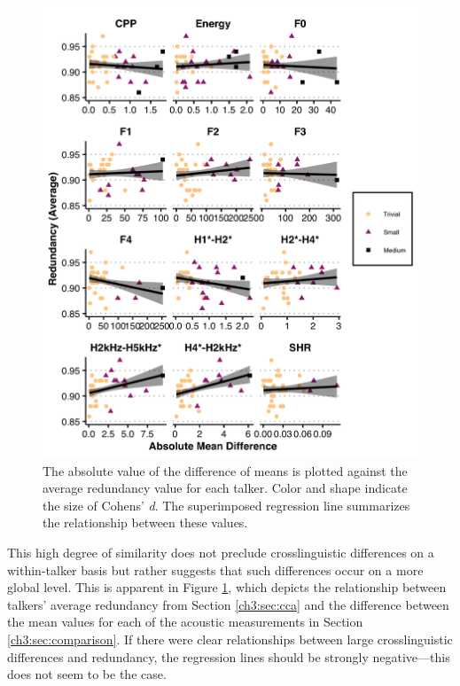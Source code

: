 \begin{figure}[htbp]
    \begin{center}
    \includegraphics[width=0.9\linewidth]{figures/ch3_redundancybyttestdiff_5in.png} 
    \caption{The absolute value of the difference of means is plotted against the average redundancy value for each talker. Color and shape indicate the size of Cohens' \textit{d}. The superimposed regression line summarizes the relationship between these values.}
    \label{ch3:fig:diffbyred}
    \end{center}
\end{figure}

This high degree of similarity does not preclude crosslinguistic differences on a within-talker basis but rather suggests that such differences occur on a more global level. This is apparent in Figure \ref{ch3:fig:diffbyred}, which depicts the relationship between talkers' average redundancy from Section \ref{ch3:sec:cca} and the difference between the mean values for each of the acoustic measurements in Section \ref{ch3:sec:comparison}. If there were clear relationships between large crosslinguistic differences and redundancy, the regression lines should be strongly negative---this does not seem to be the case.

